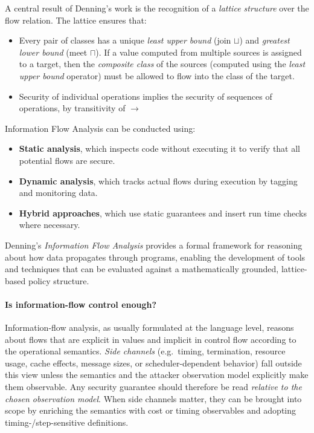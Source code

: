 \documentclass[12pt,a4paper,twoside]{book}
\begin{document}
A central result of Denning’s work is the recognition of a \textit{lattice structure} over the flow relation. The lattice ensures that:
\begin{itemize}
  \item Every pair of classes has a unique \textit{least upper bound} (join \( \sqcup \)) and \textit{greatest lower bound} (meet \( \sqcap \)).
If a value computed from multiple sources is assigned to a target, then the \textit{composite class} of the sources (computed using the \textit{least upper bound} operator) must be allowed to flow into the class of the target.
  \item Security of individual operations implies the security of sequences of operations, by transitivity of $\rightarrow$
\end{itemize}

Information Flow Analysis can be conducted using:
\begin{itemize}
  \item \textbf{Static analysis}, which inspects code without executing it to verify that all potential flows are secure.
  \item \textbf{Dynamic analysis}, which tracks actual flows during execution by tagging and monitoring data.
  \item \textbf{Hybrid approaches}, which use static guarantees and insert run time checks where necessary.
\end{itemize}

Denning's \textit{Information Flow Analysis} provides a formal framework for reasoning about how data propagates through programs, enabling the development of tools and techniques that can be evaluated against a mathematically grounded, lattice-based policy structure.

\paragraph{Is information-flow control enough?}
Information-flow analysis, as usually formulated at the language level, reasons
about flows that are explicit in values and implicit in control flow according to
the operational semantics\cite{sabelfeld2003language}.
\emph{Side channels} (e.g.\ timing, termination,
resource usage, cache effects, message sizes, or scheduler-dependent behavior)\cite{kelsey1998side}
fall outside this view unless the semantics and the attacker observation model
explicitly make them observable.
Any security guarantee should therefore be read
\emph{relative to the chosen observation model}.
When side channels matter, they can be brought into scope by enriching the semantics with cost or timing
observables and adopting timing-/step-sensitive definitions\cite{197207}.
\end{document}
